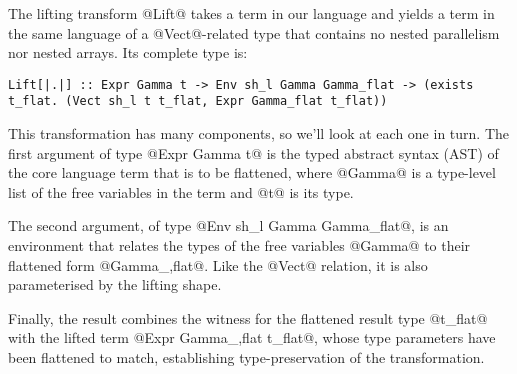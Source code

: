The lifting transform @Lift@ takes a term in our language and yields a term in the same language of a @Vect@-related type that contains no nested parallelism nor nested arrays. Its complete type is:
%
\begin{lstlisting}[style=ndp]
Lift[|.|] :: Expr Gamma t -> Env sh_l Gamma Gamma_flat -> (exists t_flat. (Vect sh_l t t_flat, Expr Gamma_flat t_flat))
\end{lstlisting}
%
This transformation has many components, so we'll look at each one in turn. The first argument of type @Expr Gamma  t@ is the typed abstract syntax (AST) of the core language term that is to be flattened, where @Gamma@ is a type-level list of the free variables in the term and @t@ is its type.

The second argument, of type @Env sh_l  Gamma  Gamma_flat@, is an environment that relates the types of the free variables @Gamma@ to their flattened form @Gamma_,flat@. Like the @Vect@ relation, it is also parameterised by the lifting shape.

Finally, the result combines the witness for the flattened result type @t_flat@ with the lifted term @Expr Gamma_,flat t_flat@, whose type parameters have been flattened to match, establishing type-preservation of the transformation.

